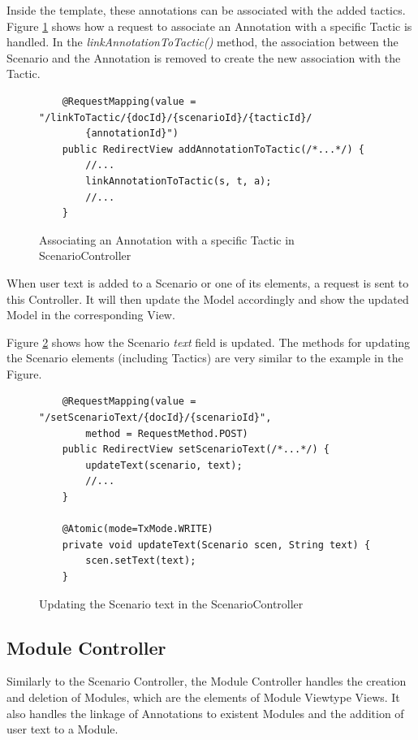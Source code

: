 Inside the template, these annotations can be associated with the added tactics. Figure \ref{figure:scenarioControllerLinkToTactic} shows how a request to associate an Annotation with a specific Tactic is handled. In the \textit{linkAnnotationToTactic()} method, the association between the Scenario and the Annotation is removed to create the new association with the Tactic.

\begin{figure}[h]
\lstset{style=customjava}
\begin{lstlisting}
	@RequestMapping(value = "/linkToTactic/{docId}/{scenarioId}/{tacticId}/
		{annotationId}")
	public RedirectView addAnnotationToTactic(/*...*/) {
		//...
		linkAnnotationToTactic(s, t, a);
		//...
	}
\end{lstlisting}
\caption{Associating an Annotation with a specific Tactic in ScenarioController}
\label{figure:scenarioControllerLinkToTactic}
\end{figure}

When user text is added to a Scenario or one of its elements, a request is sent to this Controller. It will then update the Model accordingly and show the updated Model in the corresponding View.

Figure \ref{figure:scenarioControllerText} shows how the Scenario \textit{text} field is updated. The methods for updating the Scenario elements (including Tactics) are very similar to the example in the Figure.

\begin{figure}[h]
\lstset{style=customjava}
\begin{lstlisting}
	@RequestMapping(value = "/setScenarioText/{docId}/{scenarioId}", 
		method = RequestMethod.POST)
	public RedirectView setScenarioText(/*...*/) {
		updateText(scenario, text);
		//...
	}
	
	@Atomic(mode=TxMode.WRITE)
	private void updateText(Scenario scen, String text) {
		scen.setText(text);
	}	
\end{lstlisting}
\caption{Updating the Scenario text in the ScenarioController}
\label{figure:scenarioControllerText}
\end{figure}

\subsection{Module Controller}

Similarly to the Scenario Controller, the Module Controller handles the creation and deletion of Modules, which are the elements of Module Viewtype Views. It also handles the linkage of Annotations to existent Modules and the addition of user text to a Module. 

